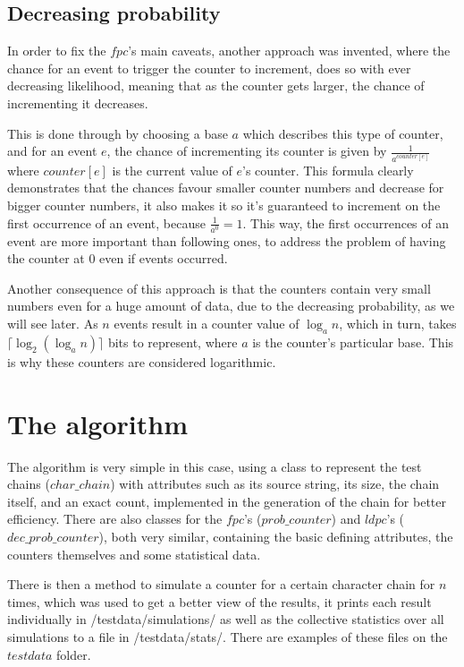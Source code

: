 \documentclass[...]{revdetua}
\begin{document}
\subsection{Decreasing probability}
In order to fix the $fpc$'s main caveats, another approach was invented, where the chance for an event to trigger the counter to increment, does so with ever decreasing likelihood, meaning that as the counter gets larger, the chance of incrementing it decreases.\par
This is done through by choosing a base $a$ which describes this type of counter, and for an event $e$, the chance of incrementing its counter is given by $\frac{1}{a^{counter[e]}}$ where $counter[e]$ is the current value of $e$'s counter. This formula clearly demonstrates that the chances favour smaller counter numbers and decrease for bigger counter numbers, it also makes  it so it's guaranteed to increment on the first occurrence of an event, because $\frac{1}{a^0}=1$.
This way, the first occurrences of an event are more important than following ones, to address the problem of having the counter at $0$ even if events occurred.\par
Another consequence of this approach is that the counters contain very small numbers even for a huge amount of data, due to the decreasing probability, as we will see later. As $n$ events result in a counter value of $\log_a n$, which in turn, takes $\lceil \log_2 ({\log_a n})\rceil$ bits to represent, where $a$ is the counter's particular base. This is why these counters are considered logarithmic.
\section{The algorithm}
The algorithm is very simple in this case, using a class to represent the test chains ($char\_chain$) with attributes such as its source string, its size, the chain itself, and an exact count, implemented in the generation of the chain for better efficiency. There are also classes for the $fpc$'s ($prob\_counter$) and $ldpc$'s  ($dec\_prob\_counter$), both very similar, containing the basic defining attributes, the counters themselves and some statistical data.\par
There is then a method to simulate a counter for a certain character chain for $n$ times, which was used to get a better view of the results, it prints each result individually in /testdata/simulations/ as well as the collective statistics over all simulations to a file in /testdata/stats/. There are examples of these files on the $testdata$ folder.
\end{document}
